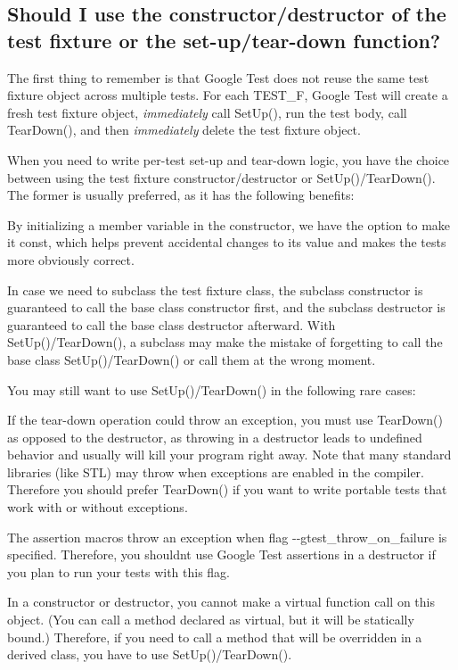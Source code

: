 \subsection*{Should I use the constructor/destructor of the test fixture or the set-\/up/tear-\/down function?}

The first thing to remember is that Google Test does not reuse the same test fixture object across multiple tests. For each {\ttfamily T\+E\+S\+T\+\_\+F}, Google Test will create a fresh test fixture object, {\itshape immediately} call {\ttfamily Set\+Up()}, run the test body, call {\ttfamily Tear\+Down()}, and then {\itshape immediately} delete the test fixture object.

When you need to write per-\/test set-\/up and tear-\/down logic, you have the choice between using the test fixture constructor/destructor or {\ttfamily Set\+Up()/\+Tear\+Down()}. The former is usually preferred, as it has the following benefits\+:


\begin{DoxyItemize}
\item By initializing a member variable in the constructor, we have the option to make it {\ttfamily const}, which helps prevent accidental changes to its value and makes the tests more obviously correct.
\item In case we need to subclass the test fixture class, the subclass\textquotesingle{} constructor is guaranteed to call the base class\textquotesingle{} constructor first, and the subclass\textquotesingle{} destructor is guaranteed to call the base class\textquotesingle{} destructor afterward. With {\ttfamily Set\+Up()/\+Tear\+Down()}, a subclass may make the mistake of forgetting to call the base class\textquotesingle{} {\ttfamily Set\+Up()/\+Tear\+Down()} or call them at the wrong moment.
\end{DoxyItemize}

You may still want to use {\ttfamily Set\+Up()/\+Tear\+Down()} in the following rare cases\+:
\begin{DoxyItemize}
\item If the tear-\/down operation could throw an exception, you must use {\ttfamily Tear\+Down()} as opposed to the destructor, as throwing in a destructor leads to undefined behavior and usually will kill your program right away. Note that many standard libraries (like S\+TL) may throw when exceptions are enabled in the compiler. Therefore you should prefer {\ttfamily Tear\+Down()} if you want to write portable tests that work with or without exceptions.
\item The assertion macros throw an exception when flag {\ttfamily -\/-\/gtest\+\_\+throw\+\_\+on\+\_\+failure} is specified. Therefore, you shouldn\textquotesingle{}t use Google Test assertions in a destructor if you plan to run your tests with this flag.
\item In a constructor or destructor, you cannot make a virtual function call on this object. (You can call a method declared as virtual, but it will be statically bound.) Therefore, if you need to call a method that will be overridden in a derived class, you have to use {\ttfamily Set\+Up()/\+Tear\+Down()}.
\end{DoxyItemize}

